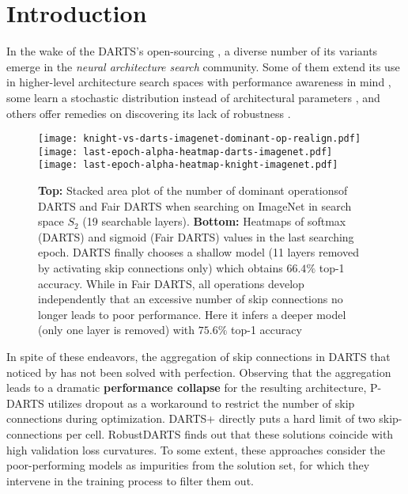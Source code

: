 \documentclass[runningheads]{llncs}
\begin{document}
\section{Introduction}\label{sec:intro}
In the wake of the DARTS's open-sourcing \cite{liu2018darts}, a diverse number of its variants emerge in the \emph{neural architecture search} community. Some of them extend its use in higher-level architecture search spaces with performance awareness in mind \cite{cai2018proxylessnas,wu2018fbnet}, some learn a stochastic distribution instead of architectural parameters \cite{wu2018fbnet,xie2018snas,zheng2019multinomial,dong2019one,dong2019searching}, and others offer remedies on discovering its lack of robustness \cite{nayman2019xnas,chen2019progressive,liang2019darts,li2019stacnas,zela2020understanding}.

\begin{figure}[ht]
	\centering
	\texttt{[image: knight-vs-darts-imagenet-dominant-op-realign.pdf]}
\texttt{[image: last-epoch-alpha-heatmap-darts-imagenet.pdf]}
	\texttt{[image: last-epoch-alpha-heatmap-knight-imagenet.pdf]}
	\caption{\textbf{Top:} Stacked area plot of the number of dominant operations\protect\footnotemark  of DARTS and Fair DARTS when searching on ImageNet in search space $S_2$ (19 searchable layers). \textbf{Bottom:} Heatmaps of softmax (DARTS) and sigmoid (Fair DARTS) values in the last searching epoch. DARTS finally chooses a shallow model (11 layers removed by activating skip connections only) which obtains $66.4\%$ top-1 accuracy. While in Fair DARTS, all operations develop independently that an excessive number of skip connections no longer leads to poor performance. Here it infers a deeper model (only one layer is removed) with $75.6\%$ top-1 accuracy} \label{fig:num-skip-imagenet}
\end{figure}

In spite of these endeavors, the aggregation of skip connections in DARTS that noticed by  \cite{chen2019progressive,liang2019darts,bi2019stabilizing,zela2020understanding} has not been solved with perfection. Observing that the aggregation leads to a dramatic \textbf{performance collapse} for the resulting architecture, P-DARTS \cite{chen2019progressive} utilizes dropout as a workaround to restrict the number of skip connections during optimization. DARTS+ \cite{liang2019darts} directly puts a hard limit of two skip-connections per cell. RobustDARTS \cite{zela2020understanding} finds out that these solutions coincide with high validation loss curvatures. To some extent, these approaches consider the poor-performing models as impurities from the solution set, for which they intervene in the training process to filter them out. 
\end{document}
